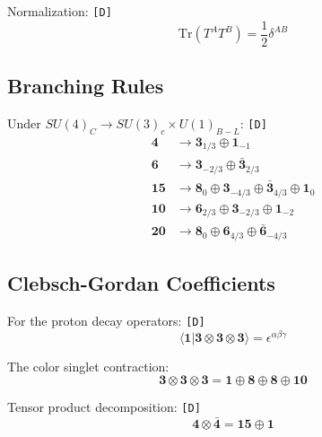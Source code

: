 \documentclass[11pt,a4paper]{article}
\newcommand{\tagD}{\textcolor{green!50!black}{\texttt{[D]}}}
\theoremstyle{definition}
\begin{document}
Normalization: \tagD{}
\begin{equation}
\label{eq:su4-norm-app}
\text{Tr}(T^A T^B) = \frac{1}{2} \delta^{AB}
\end{equation}

\subsection{Branching Rules}
\label{app:branching}

Under $SU(4)_C \to SU(3)_c \times U(1)_{B-L}$: \tagD{}
\begin{align}
\label{eq:branch-4}
\mathbf{4} &\to \mathbf{3}_{1/3} \oplus \mathbf{1}_{-1} \\
\label{eq:branch-6}
\mathbf{6} &\to \mathbf{3}_{-2/3} \oplus \bar{\mathbf{3}}_{2/3} \\
\label{eq:branch-15-app}
\mathbf{15} &\to \mathbf{8}_0 \oplus \mathbf{3}_{-4/3} \oplus \bar{\mathbf{3}}_{4/3} \oplus \mathbf{1}_0 \\
\label{eq:branch-10}
\mathbf{10} &\to \mathbf{6}_{2/3} \oplus \mathbf{3}_{-2/3} \oplus \mathbf{1}_{-2} \\
\label{eq:branch-20}
\mathbf{20} &\to \mathbf{8}_0 \oplus \mathbf{6}_{4/3} \oplus \bar{\mathbf{6}}_{-4/3}
\end{align}

\subsection{Clebsch-Gordan Coefficients}
\label{app:clebsch}

For the proton decay operators: \tagD{}
\begin{equation}
\label{eq:cg-explicit}
\langle \mathbf{1} | \mathbf{3} \otimes \mathbf{3} \otimes \mathbf{3} \rangle =
\epsilon^{\alpha\beta\gamma}
\end{equation}

The color singlet contraction:
\begin{equation}
\label{eq:color-singlet}
\mathbf{3} \otimes \mathbf{3} \otimes \mathbf{3} =
\mathbf{1} \oplus \mathbf{8} \oplus \mathbf{8} \oplus \mathbf{10}
\end{equation}

Tensor product decomposition: \tagD{}
\begin{equation}
\label{eq:tensor-product}
\mathbf{4} \otimes \bar{\mathbf{4}} = \mathbf{15} \oplus \mathbf{1}
\end{equation}

\end{document}
